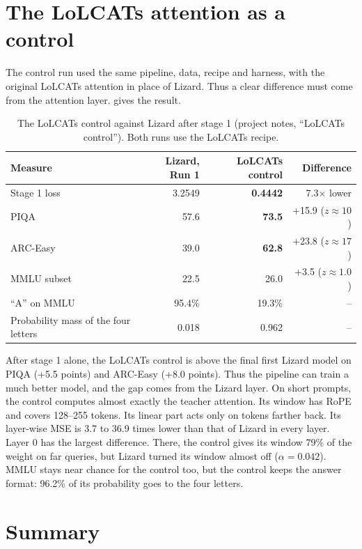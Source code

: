 \section{The LoLCATs attention as a control}
\label{sec:control}

The control run used the same pipeline, data, recipe and harness, with the original LoLCATs attention in place of Lizard. Thus a clear difference must come from the attention layer.  gives the result.

\begin{table}[ht]
\centering
\small
\caption[The LoLCATs control against Lizard after stage 1]{The LoLCATs control against Lizard after stage 1 (project notes, \enquote{LoLCATs control}). Both runs use the LoLCATs recipe.}
\label{tab:control}
\begin{tabular}{@{}lrrr@{}}
\toprule
Measure & Lizard, Run 1 & LoLCATs control & Difference \\
\midrule
Stage 1 loss & 3.2549 & \textbf{0.4442} & 7.3$\times$ lower \\
PIQA & 57.6 & \textbf{73.5} & +15.9 ($z \approx 10$) \\
ARC-Easy & 39.0 & \textbf{62.8} & +23.8 ($z \approx 17$) \\
MMLU subset & 22.5 & 26.0 & +3.5 ($z \approx 1.0$) \\
\enquote{A} on MMLU & 95.4\% & 19.3\% & -- \\
Probability mass of the four letters & 0.018 & 0.962 & -- \\
\bottomrule
\end{tabular}
\end{table}

After stage 1 alone, the LoLCATs control is above the final first Lizard model on PIQA (+5.5 points) and ARC-Easy (+8.0 points). Thus the pipeline can train a much better model, and the gap comes from the Lizard layer. On short prompts, the control computes almost exactly the teacher attention. Its window has RoPE and covers 128--255 tokens. Its linear part acts only on tokens farther back. Its layer-wise MSE is 3.7 to 36.9 times lower than that of Lizard in every layer. Layer 0 has the largest difference. There, the control gives its window 79\% of the weight on far queries, but Lizard turned its window almost off ($\alpha = 0.042$). MMLU stays near chance for the control too, but the control keeps the answer format: 96.2\% of its probability goes to the four letters.

\section{Summary}
\label{sec:gap-summary}


